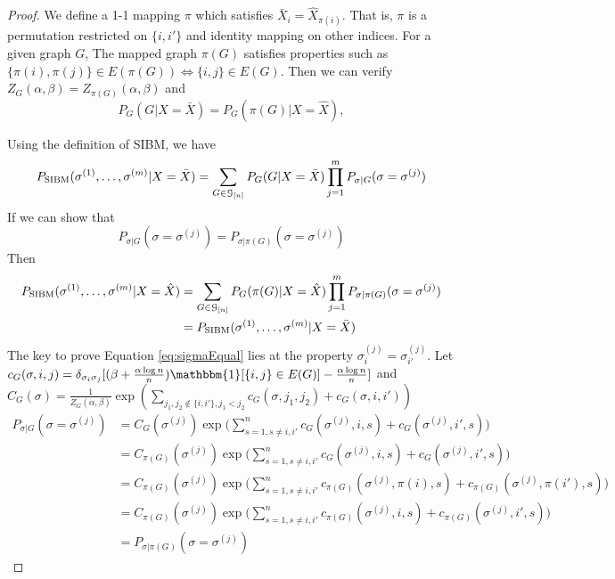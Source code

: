 \documentclass{article}
\begin{document}
\begin{proof}
We define a 1-1 mapping $\pi$ which satisfies $ \bar{X}_{i} = \hat{X}_{\pi(i)}$.
That is, $\pi$ is a permutation restricted on $\{i,i'\}$ and identity mapping on other indices.
For a given graph $G$, The mapped graph $\pi(G)$ satisfies properties such as
$\{\pi(i), \pi(j)\} \in E(\pi(G)) \iff \{i,j\} \in E(G)$. Then we can verify
$Z_G(\alpha, \beta) = Z_{\pi(G)}(\alpha, \beta)$ and
$$
P_{G}(G  | X = \bar{X})=P_{G}(\pi(G) | X = \hat{X}),
$$

Using the definition of SIBM, we have
\begin{align*}
P_{\operatorname{SIBM}}(\sigma^{(1)}, \dots, \sigma^{(m)}|X=\bar{X}) & = \sum_{G \in \mathcal{G}_{[n]}} P_{G}(G  | X = \bar{X})\prod_{j=1}^m P_{\sigma | G}(\sigma =\sigma^{(j)})\\
\end{align*}
If we can show that 
\begin{equation}\label{eq:sigmaEqual}
P_{\sigma | G}(\sigma =\sigma^{(j)}) = P_{\sigma | \pi(G)}(\sigma =\sigma^{(j)})
\end{equation}
Then 
\begin{align*}
P_{\operatorname{SIBM}}(\sigma^{(1)}, \dots, \sigma^{(m)}|X=\hat{X}) &
= \sum_{G \in \mathcal{G}_{[n]}} 
P_{G}(\pi(G)  | X = \hat{X})\prod_{j=1}^m P_{\sigma | \pi(G)}(\sigma =\sigma^{(j)})\\
& = P_{\operatorname{SIBM}}(\sigma^{(1)}, \dots, \sigma^{(m)}|X=\bar{X})
\end{align*}
The key to prove Equation \eqref{eq:sigmaEqual} lies at the property
$\sigma^{(j)}_{i} = \sigma^{(j)}_{i'}$.
Let $c_G(\sigma, i,j) = \delta_{\sigma_i\sigma_j}[(\beta + \frac{\alpha \log n}{n})\mathbbm{1}[\{i,j\}\in E(G)]  - \frac{\alpha \log n}{n}]$
and $C_G(\sigma) = \frac{1}{Z_G(\alpha, \beta)}\exp(\sum_{j_1, j_2 \not\in \{i,i'\},j_1 < j_2} c_G(\sigma, j_1, j_2) + c_G(\sigma, i, i'))$
\begin{align*}
P_{\sigma | G}(\sigma =\sigma^{(j)}) & = C_G(\sigma^{(j)})\exp\Big(\sum_{s=1,s\neq i,i'}^n c_G(\sigma^{(j)}, i, s) + c_G(\sigma^{(j)}, i', s)\Big) \\
& = C_{\pi(G)}(\sigma^{(j)})\exp\Big(\sum_{s=1,s\neq i,i'}^n c_G(\sigma^{(j)}, i, s) + c_G(\sigma^{(j)}, i', s) \Big) \\
& = C_{\pi(G)}(\sigma^{(j)})\exp\Big(\sum_{s=1,s\neq i,i'}^n c_{\pi(G)}(\sigma^{(j)}, \pi(i), s) + c_{\pi(G)}(\sigma^{(j)}, \pi(i'), s)\Big) \\
& = C_{\pi(G)}(\sigma^{(j)})\exp\Big(\sum_{s=1,s\neq i,i'}^n c_{\pi(G)}(\sigma^{(j)}, i, s) + c_{\pi(G)}(\sigma^{(j)}, i', s)\Big) \\
& = P_{\sigma | \pi(G)}(\sigma =\sigma^{(j)})
\end{align*}
\end{proof}
\end{document}
